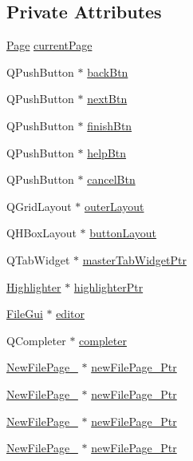 \subsection*{Private Attributes}
\begin{DoxyCompactItemize}
\item 
\hyperlink{class_new_file_gui_aa420702f51dbeefc704d546f1db144ac}{Page} \hyperlink{class_new_file_gui_adaf414f47f140c24e8f08797262c646b}{current\-Page}
\item 
Q\-Push\-Button $\ast$ \hyperlink{class_new_file_gui_a795eb9a1d91260f9f99b15b8544e71e6}{back\-Btn}
\item 
Q\-Push\-Button $\ast$ \hyperlink{class_new_file_gui_ad1fa3cb3fa909bf6e71672497350f980}{next\-Btn}
\item 
Q\-Push\-Button $\ast$ \hyperlink{class_new_file_gui_a9caaf4a098bc03388235461844770705}{finish\-Btn}
\item 
Q\-Push\-Button $\ast$ \hyperlink{class_new_file_gui_a3a59cd57999cc1004a95ab2fbb3e6766}{help\-Btn}
\item 
Q\-Push\-Button $\ast$ \hyperlink{class_new_file_gui_a5be4525cfa97c2ec799a7357eb6a1fb4}{cancel\-Btn}
\item 
Q\-Grid\-Layout $\ast$ \hyperlink{class_new_file_gui_ae5aa1370799c06f4368ef636279ab259}{outer\-Layout}
\item 
Q\-H\-Box\-Layout $\ast$ \hyperlink{class_new_file_gui_aec890bfe56498ad4c1e3865387f147b5}{button\-Layout}
\item 
Q\-Tab\-Widget $\ast$ \hyperlink{class_new_file_gui_a9a3baa00763c6d8d90e7e39ea3f1585c}{master\-Tab\-Widget\-Ptr}
\item 
\hyperlink{class_highlighter}{Highlighter} $\ast$ \hyperlink{class_new_file_gui_a4a63ed16985eeb14fbe35e3197420873}{highlighter\-Ptr}
\item 
\hyperlink{class_file_gui}{File\-Gui} $\ast$ \hyperlink{class_new_file_gui_a7521ff2d2934c4a19fbef21a3a034ee9}{editor}
\item 
Q\-Completer $\ast$ \hyperlink{class_new_file_gui_a5c8508fb9dba194838e0cfce4d6f7988}{completer}
\item 
\hyperlink{class_new_file_page__1}{New\-File\-Page\-\_} $\ast$ \hyperlink{class_new_file_gui_afdeb5fdcb313e360f1479a5fd3553e4b}{new\-File\-Page\-\_\-Ptr}
\item 
\hyperlink{class_new_file_page__2}{New\-File\-Page\-\_} $\ast$ \hyperlink{class_new_file_gui_ad976d235939ccda48373c3a1ced35341}{new\-File\-Page\-\_\-Ptr}
\item 
\hyperlink{class_new_file_page__3}{New\-File\-Page\-\_} $\ast$ \hyperlink{class_new_file_gui_a2a6f8c88d96686a0e84c537bb9b77f09}{new\-File\-Page\-\_\-Ptr}
\item 
\hyperlink{class_new_file_page__4}{New\-File\-Page\-\_} $\ast$ \hyperlink{class_new_file_gui_a5b83d6fcae79fb5da3677848ec49647f}{new\-File\-Page\-\_\-Ptr}
\end{DoxyCompactItemize}


